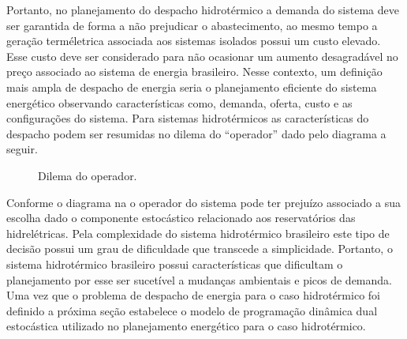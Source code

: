 Portanto, no planejamento do despacho hidrot\'ermico a demanda do sistema deve ser garantida de forma a n\~ao prejudicar o
abastecimento, ao mesmo tempo a gera\c c\~ao term\'eletrica associada aos sistemas isolados possui um custo elevado. 
Esse custo deve ser considerado para n\~ao ocasionar um
aumento desagrad\'avel no pre\c co  associado ao sistema de energia brasileiro. 
Nesse contexto, um defini\c c\~ao mais ampla de despacho de energia seria o planejamento 
eficiente do sistema energ\'etico observando caracter\'isticas como, demanda, oferta, custo e
  as configura\c c\~oes do sistema. Para sistemas
 hidrot\'ermicos as caracter\'isticas do despacho podem ser resumidas no dilema do
 ``operador'' dado pelo diagrama a seguir.
 \begin{figure}[!h]
 \centering
 \caption {Dilema do operador.}  
 \label{dilop}
 \end{figure}

 Conforme o diagrama na  o operador do sistema pode ter preju\'izo associado a sua escolha dado o componente
 estoc\'astico
relacionado aos
reservat\'orios das hidrel\'etricas. Pela complexidade do sistema hidrot\'ermico
brasileiro este tipo de decis\~ao possui um grau de dificuldade que transcede a simplicidade. Portanto, o sistema
hidrot\'ermico brasileiro possui caracter\'isticas que dificultam o planejamento por esse ser sucet\'ivel a mudan\c cas
ambientais e picos de demanda. Uma vez que o problema de despacho de energia para o caso hidrot\'ermico foi definido 
a pr\'oxima se\c c\~ao estabelece o modelo de programa\c c\~ao din\^amica dual estoc\'astica utilizado no planejamento
energ\'etico para o caso hidrot\'ermico. 
